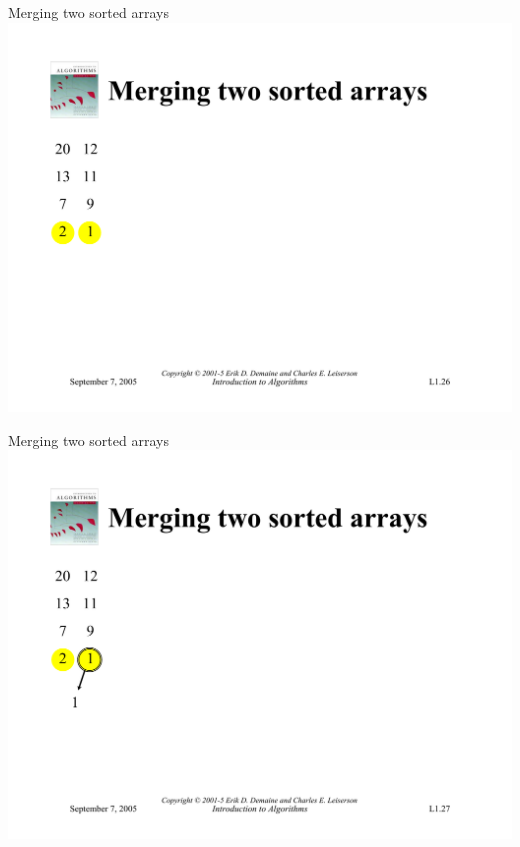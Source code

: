 \documentclass{beamer}
\begin{document}
\begin{frame}{Merging two sorted arrays}
    \centering
    \includegraphics[width=\textwidth, trim={1.1cm 6cm 1.1cm 4.95cm}, clip]{pages/lec1_26}
\end{frame}
\begin{frame}{Merging two sorted arrays}
    \centering
    \includegraphics[width=\textwidth, trim={1.1cm 6cm 1.1cm 4.95cm}, clip]{pages/lec1_27}
\end{frame}
\end{document}
